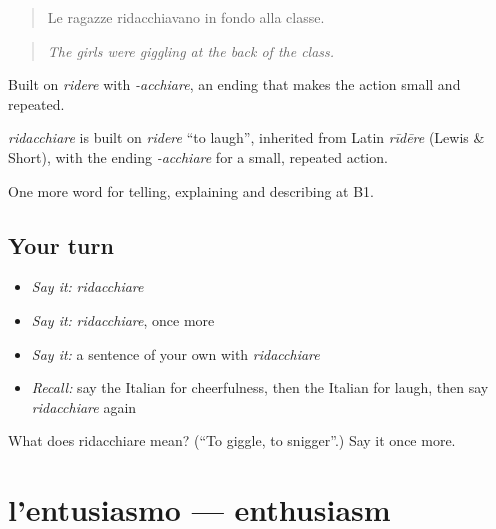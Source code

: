 \begin{quote}
Le ragazze ridacchiavano in fondo alla classe.
\end{quote}

\begin{quote}
\emph{The girls were giggling at the back of the class.}
\end{quote}

Built on \emph{ridere} with \emph{-acchiare}, an ending that makes the action small and repeated.

\begin{cousinweb}
\emph{ridacchiare} is built on \emph{ridere} \textquotedblleft{}to laugh\textquotedblright{}, inherited from Latin \emph{rīdēre} (Lewis \& Short), with the ending \emph{-acchiare} for a small, repeated action.
\end{cousinweb}

\begin{grammarlens}[title={What you've built}]
One more word for telling, explaining and describing at B1.
\end{grammarlens}

\subsection*{Your turn}
\begin{itemize}
\raggedright
  \item \emph{Say it:} \emph{ridacchiare}
  \item \emph{Say it:} \emph{ridacchiare}, once more
  \item \emph{Say it:} a sentence of your own with \emph{ridacchiare}
  \item \emph{Recall:} say the Italian for cheerfulness, then the Italian for laugh, then say \emph{ridacchiare} again
\end{itemize}

\begin{tcolorbox}[breakable,colback=teal!4,colframe=teal!35!black,title={Before you move on}]
What does ridacchiare mean? (\textquotedblleft{}To giggle, to snigger\textquotedblright{}.) Say it once more.
\end{tcolorbox}
\section[l'entusiasmo]{l'entusiasmo — enthusiasm}

\label{lesson:IT-C479-entusiasmo}



